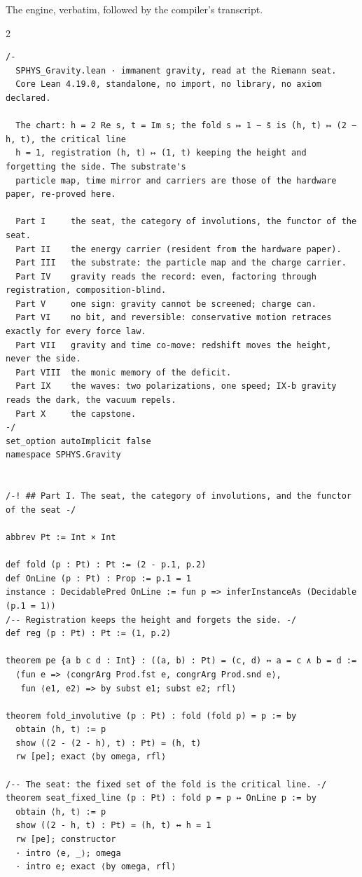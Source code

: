 \documentclass[10pt]{article}
\begin{document}
The engine, verbatim, followed by the compiler's transcript.

\begin{multicols}{2}
\begin{Verbatim}[fontsize=\fontsize{5.9}{6.8}\selectfont,breaklines,breakanywhere,breaksymbolleft={}]
/-
  SPHYS_Gravity.lean · immanent gravity, read at the Riemann seat.
  Core Lean 4.19.0, standalone, no import, no library, no axiom declared.

  The chart: h = 2 Re s, t = Im s; the fold s ↦ 1 − s̄ is (h, t) ↦ (2 − h, t), the critical line
  h = 1, registration (h, t) ↦ (1, t) keeping the height and forgetting the side. The substrate's
  particle map, time mirror and carriers are those of the hardware paper, re-proved here.

  Part I     the seat, the category of involutions, the functor of the seat.
  Part II    the energy carrier (resident from the hardware paper).
  Part III   the substrate: the particle map and the charge carrier.
  Part IV    gravity reads the record: even, factoring through registration, composition-blind.
  Part V     one sign: gravity cannot be screened; charge can.
  Part VI    no bit, and reversible: conservative motion retraces exactly for every force law.
  Part VII   gravity and time co-move: redshift moves the height, never the side.
  Part VIII  the monic memory of the deficit.
  Part IX    the waves: two polarizations, one speed; IX-b gravity reads the dark, the vacuum repels.
  Part X     the capstone.
-/
set_option autoImplicit false
namespace SPHYS.Gravity


/-! ## Part I. The seat, the category of involutions, and the functor of the seat -/

abbrev Pt := Int × Int

def fold (p : Pt) : Pt := (2 - p.1, p.2)
def OnLine (p : Pt) : Prop := p.1 = 1
instance : DecidablePred OnLine := fun p => inferInstanceAs (Decidable (p.1 = 1))
/-- Registration keeps the height and forgets the side. -/
def reg (p : Pt) : Pt := (1, p.2)

theorem pe {a b c d : Int} : ((a, b) : Pt) = (c, d) ↔ a = c ∧ b = d :=
  ⟨fun e => ⟨congrArg Prod.fst e, congrArg Prod.snd e⟩,
   fun ⟨e1, e2⟩ => by subst e1; subst e2; rfl⟩

theorem fold_involutive (p : Pt) : fold (fold p) = p := by
  obtain ⟨h, t⟩ := p
  show ((2 - (2 - h), t) : Pt) = (h, t)
  rw [pe]; exact ⟨by omega, rfl⟩

/-- The seat: the fixed set of the fold is the critical line. -/
theorem seat_fixed_line (p : Pt) : fold p = p ↔ OnLine p := by
  obtain ⟨h, t⟩ := p
  show ((2 - h, t) : Pt) = (h, t) ↔ h = 1
  rw [pe]; constructor
  · intro ⟨e, _⟩; omega
  · intro e; exact ⟨by omega, rfl⟩


\end{Verbatim}
\end{multicols}
\end{document}
